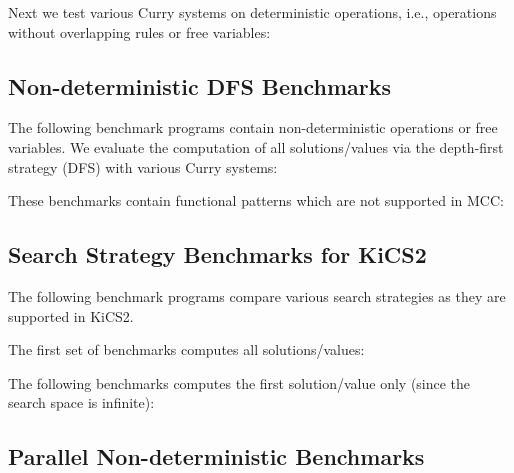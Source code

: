 \documentclass{article}
\begin{document}
Next we test various Curry systems on deterministic operations,
i.e., operations without overlapping rules or free variables:

\begin{center}
\end{center}


\subsection{Non-deterministic DFS Benchmarks}

The following benchmark programs contain non-deterministic operations
or free variables. We evaluate the computation of all
solutions/values via the depth-first strategy (DFS)
with various Curry systems:

\begin{center}
\end{center}

These benchmarks contain functional patterns which are not supported in MCC:

\begin{center}
\end{center}


\subsection{Search Strategy Benchmarks for KiCS2}

The following benchmark programs compare various search strategies
as they are supported in KiCS2.

The first set of benchmarks computes all solutions/values:

\begin{center}
\end{center}

The following benchmarks computes the first solution/value
only (since the search space is infinite):

\begin{center}
\end{center}


\subsection{Parallel Non-deterministic Benchmarks}
\end{document}
